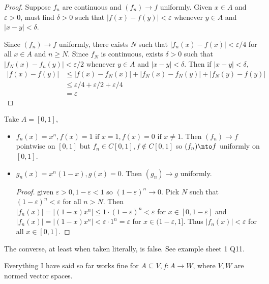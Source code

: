 \documentclass[a4paper]{article}
\theoremstyle{definition}
\begin{document}
\begin{proof}
  Suppose \(f_n\) are continuous and \((f_n)\to f\) uniformly. Given \(x\in A\) and \(\varepsilon>0\), must find \(\delta>0\) such that \(|f(x)-f(y)| < \varepsilon\) whenever \(y\in A\) and \(|x-y|<\delta\).

  Since \((f_n)\to f\) uniformly, there exists \(N\) such that \(|f_n(x)-f(x)|< \varepsilon/4\) for all \(x\in A\) and \(n\geq N\). Since \(f_N\) is continuous, exists \(\delta>0\) such that \(|f_N(x)-f_n(y)|<\varepsilon/2\) whenever \(y\in A\) and \(|x-y|<\delta\). Then if \(|x-y| < \delta\),
  \begin{align*}
    |f(x)-f(y)| &\leq |f(x)-f_N(x)| + |f_N(x)-f_N(y)| + |f_N(y)-f(y)| \\
    &\leq \varepsilon/4 + \varepsilon/2 + \varepsilon/4 \\
    &= \varepsilon
  \end{align*}
\end{proof}

\begin{eg}
  Take \(A=[0,1]\),
  \begin{itemize}
  \item \(f_n(x)=x^n, f(x) = 1\text{ if } x=1, f(x)=0 \text{ if } x\neq 1\). Then \((f_n)\to f\) pointwise on \([0,1]\) but \(f_n\in C[0,1], f\notin C[0,1]\) so \((f_n)\nto f\) uniformly on \([0,1]\).
  \item \(g_n(x) = x^n(1-x), g(x) =0\). Then \((g_n)\to g\) uniformly.
\begin{proof}
  given \(\varepsilon>0, 1-\varepsilon<1\) so \((1-\varepsilon)^n\to 0\). Pick \(N\) such that \((1-\varepsilon)^n < \varepsilon\) for all \(n> N\). Then \(|f_n(x)| = |(1-x)x^n| \leq 1\cdot(1-\varepsilon)^n < \varepsilon\) for \(x\in[0,1-\varepsilon]\) and \(|f_n(x)| = |(1-x)x^n| < \varepsilon\cdot1^n=\varepsilon\) for \(x\in (1-\varepsilon,1]\). Thus \(|f_n(x)| < \varepsilon\) for all \(x\in[0,1]\).
\end{proof}
  \end{itemize}
\end{eg}

\begin{note}
  The converse, at least when taken literally, is false. See example sheet 1 Q11.
\end{note}

\begin{remark}
  Everything I have said so far works fine for \(A\subseteq V, f: A\to W\), where \(V, W\) are normed vector spaces.
\end{remark}
\end{document}
